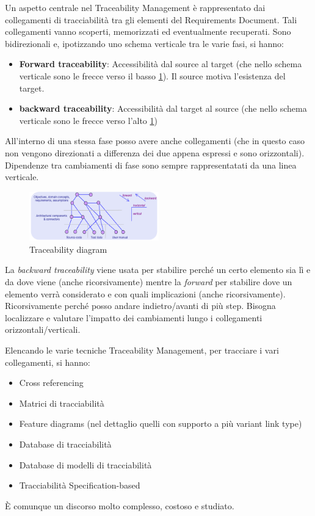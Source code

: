 Un aspetto centrale nel Traceability Management è rappresentato dai collegamenti
di tracciabilità tra gli elementi del Requirements Document. Tali collegamenti
vanno scoperti, memorizzati ed eventualmente recuperati. Sono bidirezionali e,
ipotizzando uno schema verticale tra le varie fasi, si hanno:
\begin{itemize}
      \item \textbf{Forward traceability}: Accessibilità dal source al target
            (che nello schema verticale sono le frecce verso il basso
            \ref{fig:traceability-diagram}). Il source motiva l'esistenza del
            target.
      \item \textbf{backward traceability}: Accessibilità dal target al source
            (che nello schema verticale sono le frecce verso l'alto
            \ref{fig:traceability-diagram})
\end{itemize}
All'interno di una stessa fase posso avere anche collegamenti (che in questo caso
non vengono direzionati a differenza dei due appena espressi e sono orizzontali).
Dipendenze tra cambiamenti di fase sono sempre rappresentatati da una linea verticale.
\begin{figure}[!ht]
      \centering
      \includegraphics[width=0.5\textwidth]{img/requirements/traceability-diagram.png}
      \caption{Traceability diagram}
      \label{fig:traceability-diagram}
\end{figure}
La \textit{backward traceability} viene usata per stabilire perché un certo
elemento sia lì e da dove viene (anche ricorsivamente) mentre la \textit{forward}
per stabilire dove un elemento verrà considerato e con quali implicazioni
(anche ricorsivamente). Ricorsivamente perché posso andare indietro/avanti di
più step. Bisogna localizzare e valutare l'impatto dei cambiamenti lungo i
collegamenti orizzontali/verticali.

Elencando le varie tecniche Traceability Management, per tracciare i vari
collegamenti, si hanno:
\begin{itemize}
      \item Cross referencing
      \item Matrici di tracciabilità
      \item Feature diagrams (nel dettaglio quelli con supporto a più variant link
            type)
      \item Database di tracciabilità
      \item Database di modelli di tracciabilità
      \item Tracciabilità Specification-based
\end{itemize}
È comunque un discorso molto complesso, costoso e studiato.

